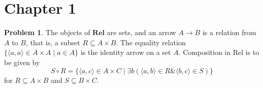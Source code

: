 \documentclass[fontsize=14pt]{scrartcl}
\theoremstyle{definition}
\newtheorem{problem-internal}{Problem}[section]
\newenvironment{problem}{
\medskip
\begin{problem-internal}
}{
\end{problem-internal}
}
\begin{document}
\section*{Chapter 1}

\setcounter{section}{9}
\setcounter{problem-internal}{0}
\begin{problem}
    The objects of $\mathbf{R e l}$ are sets, and an arrow $A \rightarrow B$ is a relation from $A$ to $B$, that is, a subset $R \subseteq A \times B .$ The equality relation $\{\langle a, a\rangle \in A \times A \mid a \in A\}$ is the identity arrow on a set $A .$ Composition in Rel is to be given by
    $$
    S \circ R=\{\langle a, c\rangle \in A \times C \mid \exists b(\langle a, b\rangle \in R \&\langle b, c\rangle \in S)\}
    $$
    for $R \subseteq A \times B$ and $S \subseteq B \times C$.
\end{problem}
\end{document}

